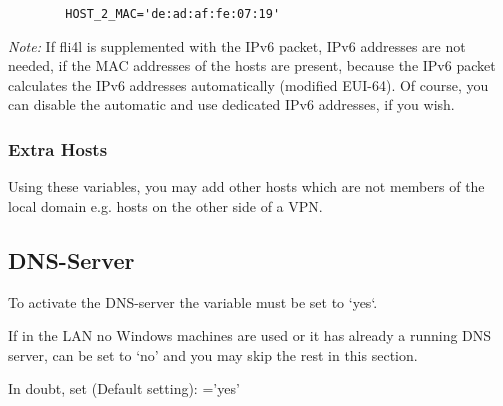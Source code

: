\begin{description}
{\begin{example}
\begin{verbatim}
        HOST_2_MAC='de:ad:af:fe:07:19'
\end{verbatim}
\end{example}

      \emph{Note:} If fli4l is supplemented with the IPv6 packet, IPv6
       addresses are not needed, if the MAC addresses of the hosts are
       present, because the IPv6 packet calculates the IPv6 addresses
       automatically (modified EUI-64). Of course, you can disable
       the automatic and use dedicated IPv6 addresses, if you wish.}

\end{description}

\subsubsection{Extra Hosts}
  \begin{description}
  {
      Using these variables, you may add other hosts which are not members of the
      local domain e.g. hosts on the other side of a VPN.
  }
\end{description}


\subsection{DNS-Server}
  \begin{description}

    {To activate the DNS-server the variable  must be set
    to `yes`.

    If in the LAN no Windows machines are used or it has already
    a running DNS server,  can be set to `no' and you may skip
    the rest in this section.

    In doubt, set (Default setting): ='yes'}

\end{description}

